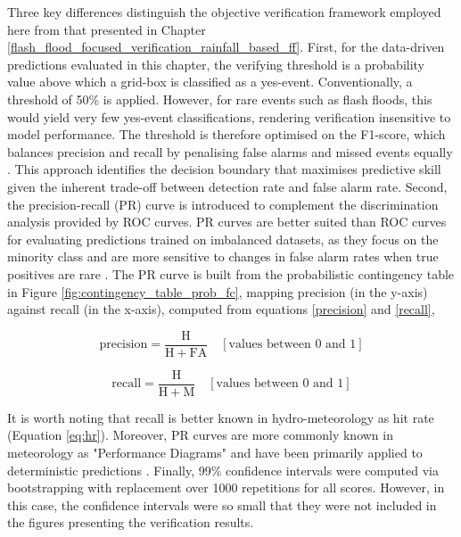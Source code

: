 Three  key differences distinguish the objective verification framework employed here from that presented in Chapter \ref{flash_flood_focused_verification_rainfall_based_ff}. First, for the data-driven predictions evaluated in this chapter, the verifying threshold is a probability value above which a grid-box is classified as a yes-event. Conventionally, a threshold of 50\% is applied. However, for rare events such as flash floods, this would yield very few yes-event classifications, rendering verification insensitive to model performance. The threshold is therefore optimised on the F1-score, which balances precision and recall by penalising false alarms and missed events equally \citep{Hancock_2022}. This approach identifies the decision boundary that maximises predictive skill given the inherent trade-off between detection rate and false alarm rate. Second, the precision-recall (PR) curve is introduced to complement the discrimination analysis provided by ROC curves. PR curves are better suited than ROC curves for evaluating predictions trained on imbalanced datasets, as they focus on the minority class and are more sensitive to changes in false alarm rates when true positives are rare \citep{Saito_2015, Juba_2019, Sofaer_2019}. The PR curve is built from the probabilistic contingency table in Figure \ref{fig:contingency_table_prob_fc}, mapping precision (in the y-axis) against recall (in the x-axis), computed from equations \ref{precision} and \ref{recall}, 

\begin{equation}
\mathrm{precision} = \frac{\mathrm{H}}{\mathrm{H} + \mathrm{FA}}\quad[\text{values between }0\text{ and }1]
\label{eq:precision}
\end{equation}

\begin{equation}
\mathrm{recall} = \frac{\mathrm{H}}{\mathrm{H} + \mathrm{M}}\quad[\text{values between }0\text{ and }1]
\label{eq:recall}
\end{equation}

\noindent It is worth noting that recall is better known in hydro-meteorology as hit rate (Equation \ref{eq:hr}). Moreover, PR curves are more commonly known in meteorology as "Performance Diagrams" and have been primarily applied to deterministic predictions \citep{Taylor_2001}. Finally, 99\% confidence intervals were computed via bootstrapping with replacement over 1000 repetitions for all scores. However, in this case, the confidence intervals were so small that they were not included in the figures presenting the verification results.



